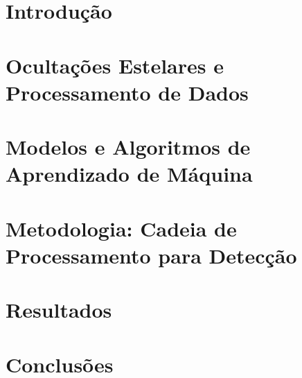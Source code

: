 \documentclass[msc]{on} %
\begin{document}
\listoffigures
\listoftables
\tableofcontents

\mainmatter

\chapter{Introdu\c c\~ao}



\chapter{Ocultações Estelares e Processamento de Dados}



\chapter{Modelos e Algoritmos de Aprendizado de Máquina}



\let\oldchaptermark\chaptermark %
\renewcommand{\chaptermark}[1]{\oldchaptermark{Metodologia}}
\chapter{Metodologia: Cadeia de Processamento para Detecção}
\let\chaptermark\oldchaptermark



\chapter{Resultados}



\chapter{Conclusões}
\label{cap:conclusoes}



\backmatter

%
%
\end{document}
